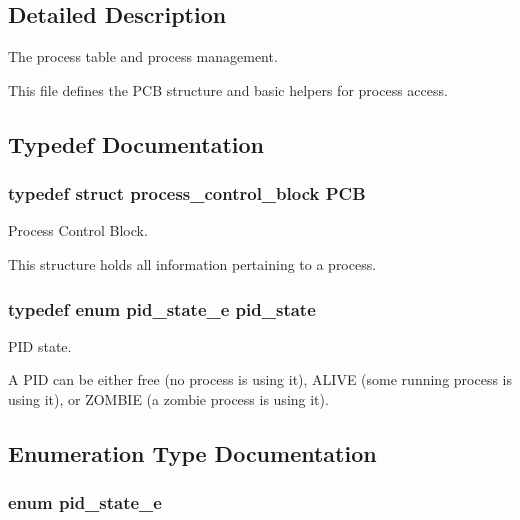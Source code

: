 \subsection{Detailed Description}
The process table and process management. 

This file defines the P\+CB structure and basic helpers for process access. 

\subsection{Typedef Documentation}
\subsubsection[{\texorpdfstring{P\+CB}{PCB}}]{\setlength{\rightskip}{0pt plus 5cm}typedef struct {\bf process\+\_\+control\+\_\+block} {\bf P\+CB}}\hypertarget{group__proc_ga91aaadf0c3f9cef2293a99c69795323f}{}\label{group__proc_ga91aaadf0c3f9cef2293a99c69795323f}


Process Control Block. 

This structure holds all information pertaining to a process. 
\subsubsection[{\texorpdfstring{pid\+\_\+state}{pid_state}}]{\setlength{\rightskip}{0pt plus 5cm}typedef enum {\bf pid\+\_\+state\+\_\+e}  {\bf pid\+\_\+state}}\hypertarget{group__proc_gade1eea4d20492c4c97263201145e5097}{}\label{group__proc_gade1eea4d20492c4c97263201145e5097}


P\+ID state. 

A P\+ID can be either free (no process is using it), A\+L\+I\+VE (some running process is using it), or Z\+O\+M\+B\+IE (a zombie process is using it). 

\subsection{Enumeration Type Documentation}
\subsubsection[{\texorpdfstring{pid\+\_\+state\+\_\+e}{pid_state_e}}]{\setlength{\rightskip}{0pt plus 5cm}enum {\bf pid\+\_\+state\+\_\+e}}\hypertarget{group__proc_ga4f133ac5f9b2ca9c1446889baee1dc05}{}\label{group__proc_ga4f133ac5f9b2ca9c1446889baee1dc05}


